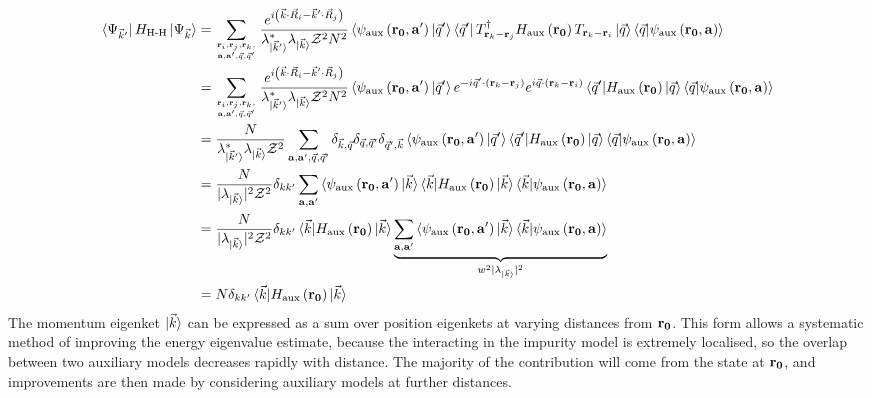 \documentclass[reprint,hidelinks,onecolumn]{revtex4-2}
\begin{document}
\begin{equation}\begin{aligned}
	\bra{\Psi_{\vec k^\prime}}H_\text{H-H} \ket{\Psi_{\vec k}} &= \sum_{{\bf r}_i, {\bf r}_j, {\bf r}_k, \atop{{\bf a}, {\bf a}^\prime, \vec q, \vec q^\prime}}\frac{e^{i\left(\vec{k}\cdot\vec{R}_i - \vec{k}^\prime\cdot\vec{R}_j\right)}}{\lambda^*_{\ket{\vec k^\prime}} \lambda_{\ket{\vec k}} \mathcal{Z}^2 N^2} \braket{\psi_\text{aux}\left({\bf r_0}, {\bf a}^\prime\right)| \vec q^\prime}\bra{\vec q^\prime} T^\dagger_{{\bf r}_k - {\bf r}_j} H_\text{aux}\left({\bf r_0}\right) T_{{\bf r}_k - {\bf r}_i}  \ket{\vec q}\braket{\vec q | \psi_\text{aux}\left({\bf r_0}, {\bf a}\right)}\\
								   &= \sum_{{\bf r}_i, {\bf r}_j, {\bf r}_k, \atop{{\bf a}, {\bf a}^\prime, \vec q, \vec q^\prime}}\frac{e^{i\left(\vec{k}\cdot\vec{R}_i - \vec{k}^\prime\cdot\vec{R}_j\right)}}{\lambda^*_{\ket{\vec k^\prime}} \lambda_{\ket{\vec k}} \mathcal{Z}^2 N^2} \braket{\psi_\text{aux}\left({\bf r_0}, {\bf a}^\prime\right)| \vec q^\prime} e^{-i \vec q^\prime \cdot \left({\bf r}_k - {\bf r}_j\right) } e^{i \vec q \cdot \left({\bf r}_k - {\bf r}_i\right)} \braket{\vec q^\prime | H_\text{aux}\left({\bf r_0}\right) | \vec q}  \braket{\vec q | \psi_\text{aux}\left({\bf r_0}, {\bf a}\right)}\\
								   &= \frac{N}{\lambda^*_{\ket{\vec k^\prime}} \lambda_{\ket{\vec k}} \mathcal{Z}^2}\sum_{{\bf a}, {\bf a}^\prime, \vec q, \vec q^\prime} \delta_{\vec k, \vec q} \delta_{\vec q,\vec q^\prime} \delta_{\vec q^\prime,\vec k} \braket{\psi_\text{aux}\left({\bf r_0}, {\bf a}^\prime\right)| \vec q^\prime} \braket{\vec q^\prime | H_\text{aux}\left({\bf r_0}\right) | \vec q}  \braket{\vec q | \psi_\text{aux}\left({\bf r_0}, {\bf a}\right)}\\
								   &= \frac{N}{|\lambda_{\ket{\vec k}}|^2 \mathcal{Z}^2}\delta_{kk^\prime}\sum_{{\bf a}, {\bf a}^\prime} \braket{\psi_\text{aux}\left({\bf r_0}, {\bf a}^\prime\right)| \vec k} \braket{\vec k | H_\text{aux}\left({\bf r_0}\right) | \vec k}  \braket{\vec k | \psi_\text{aux}\left({\bf r_0}, {\bf a}\right)}\\
								   &= \frac{N}{|\lambda_{\ket{\vec k}}|^2 \mathcal{Z}^2}\delta_{kk^\prime}\braket{\vec k | H_\text{aux}\left({\bf r_0}\right) | \vec k} \underbrace{\sum_{{\bf a}, {\bf a}^\prime} \braket{\psi_\text{aux}\left({\bf r_0}, {\bf a}^\prime\right)| \vec k} \braket{\vec k | \psi_\text{aux}\left({\bf r_0}, {\bf a}\right)}}_{w^2 |\lambda_{\ket{\vec k}}|^2}\\
	&= N\delta_{kk^\prime}\braket{\vec k | H_\text{aux}\left({\bf r_0}\right) | \vec k}
\end{aligned}\end{equation}
The momentum eigenket \(\ket{\vec k}\) can be expressed as a sum over position eigenkets at varying distances from \({\bf r_0}\). This form allows a systematic method of improving the energy eigenvalue estimate, because the interacting in the impurity model is extremely localised, so the overlap between two auxiliary models decreases rapidly with distance. The majority of the contribution will come from the state at \({\bf r_0}\), and improvements are then made by considering auxiliary models at further distances. 
\end{document}
